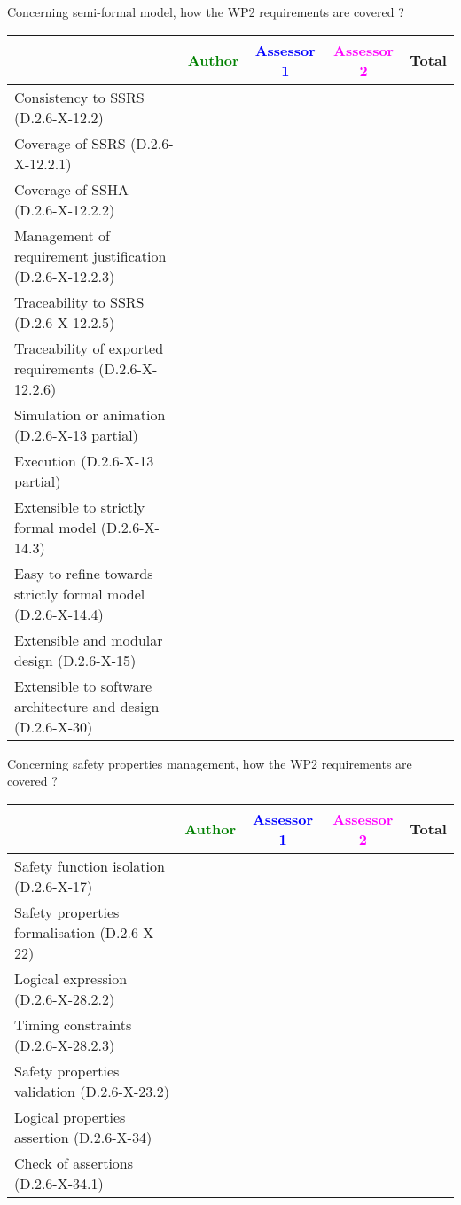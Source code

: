 Concerning semi-formal model, how the WP2 requirements are covered ?

\begin{tabular}{|l | c | c | c | c|}
\hline
& \textcolor{green}{Author} & \textcolor{blue}{Assessor 1} & \textcolor{magenta}{Assessor 2} & Total \\
\hline 
Consistency to SSRS (D.2.6-X-12.2) & & & &  \\
\hline
Coverage of SSRS (D.2.6-X-12.2.1)  & & & &  \\
\hline
Coverage of SSHA (D.2.6-X-12.2.2)  & & & &  \\
\hline
Management of requirement justification (D.2.6-X-12.2.3)  & & & &  \\
\hline
Traceability to  SSRS (D.2.6-X-12.2.5)  & & & &  \\
\hline
Traceability of exported requirements (D.2.6-X-12.2.6)  & & & &  \\
\hline
Simulation or animation (D.2.6-X-13 partial)  & & & &  \\
\hline
Execution (D.2.6-X-13 partial)  & & & &  \\
\hline
Extensible to strictly formal model (D.2.6-X-14.3) & & & &  \\
\hline
Easy to  refine towards strictly formal model (D.2.6-X-14.4) & & & &  \\
\hline
Extensible and modular design (D.2.6-X-15)  & & & &  \\
\hline
Extensible to software architecture and design (D.2.6-X-30)   & & & &  \\
\hline
\end{tabular}

Concerning safety properties management, how the WP2 requirements are covered ?

\begin{tabular}{|l | c | c | c | c|}
\hline
& \textcolor{green}{Author} & \textcolor{blue}{Assessor 1} & \textcolor{magenta}{Assessor 2} & Total \\
\hline 
Safety function isolation (D.2.6-X-17)  & & & &  \\
\hline 
Safety properties formalisation (D.2.6-X-22)  & & & &  \\
\hline
Logical expression (D.2.6-X-28.2.2)  & & & &  \\
\hline
Timing constraints (D.2.6-X-28.2.3)  & & & &  \\
\hline
Safety properties validation (D.2.6-X-23.2)  & & & &  \\
\hline
Logical properties assertion (D.2.6-X-34)  & & & &  \\
\hline
Check  of assertions (D.2.6-X-34.1)  & & & &  \\
\hline
\end{tabular}

